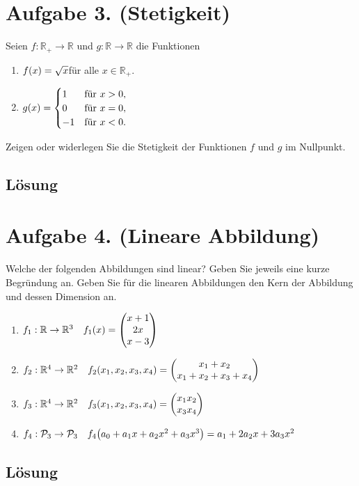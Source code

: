 \documentclass[german,12pt]{homework}
\newcommand{\RR}{\mathbb{R}}
\newcommand{\PP}{\mathcal{P}}
\DeclarePairedDelimiter{\enbrace}{(}{)}
\begin{document}
    \section*{Aufgabe 3. (Stetigkeit)}

    \begin{problem}
        Seien \(f: \RR_+ \to \RR\) und \(g: \RR \to \RR\) die Funktionen
        \begin{enumerate}
            \item \(f\enbrace*{x} = \sqrt{x}\){\quad}für alle \(x \in \RR_+\).
            \item \(g\enbrace*{x} = \begin{cases}
                1 & \text{für }x > 0,\\
                0 & \text{für }x = 0,\\
                -1 & \text{für }x < 0.
            \end{cases}\)
        \end{enumerate}
        Zeigen oder widerlegen Sie die Stetigkeit der Funktionen \(f\) und \(g\)
        im Nullpunkt.
    \end{problem}

    \subsection*{Lösung}

    \section*{Aufgabe 4. (Lineare Abbildung)}

    \begin{problem}
        Welche der folgenden Abbildungen sind linear? Geben Sie jeweils eine
        kurze Begründung an. Geben Sie für die linearen Abbildungen den Kern der
        Abbildung und dessen Dimension an.
        \begin{enumerate}
            \item \(f_1: \RR \to \RR^3 \quad f_1\enbrace*{x} = \begin{pmatrix}
            x + 1\\2x\\x - 3\end{pmatrix}\)
            \item \(f_2: \RR^4 \to \RR^2 \quad f_2\enbrace*{x_1, x_2, x_3, x_4}
            = \begin{pmatrix}x_1 + x_2\\x_1 + x_2 + x_3 + x_4\end{pmatrix}\)
            \item \(f_3: \RR^4 \to \RR^2 \quad f_3\enbrace*{x_1, x_2, x_3, x_4}
            = \begin{pmatrix}x_1x_2\\x_3x_4\end{pmatrix}\)
            \item \(f_4: \PP_3 \to \PP_3 \quad f_4\enbrace*{a_0 + a_1x + a_2x^2
            + a_3x^3} = a_1 + 2a_2x + 3a_3x^2\)
        \end{enumerate}
    \end{problem}

    \subsection*{Lösung}
\end{document}
